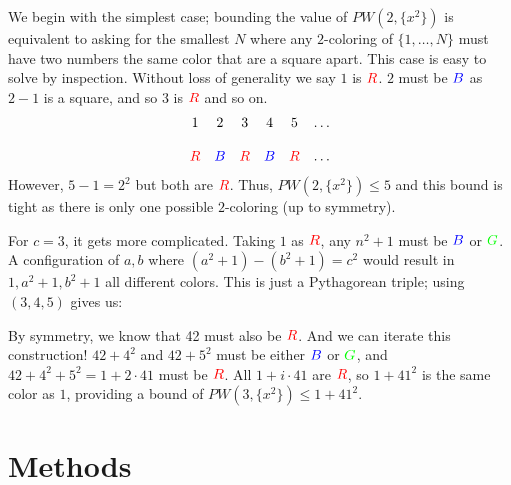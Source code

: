 \documentclass[a4paper]{amsproc}
\theoremstyle{plain}
\newcommand{\RR} {\color{red} R}
\newcommand{\BB} {\color{blue} B}
\newcommand{\GG} {\color{green} G}
\begin{document}
We begin with the simplest case; bounding the value of $PW(2,\{x^2\})$ is equivalent to asking for the smallest $N$ where any $2$-coloring of $\{1,\ldots,N\}$ must have two numbers the same color that are a square apart.
This case is easy to solve by inspection.
Without loss of generality we say $1$ is $\RR$.
$2$ must be $\BB$ as $2-1$ is a square, and so $3$ is $\RR$ and so on.
\[\begin{matrix}1&2&3&4&5&\ldots\\\\\RR&\BB&\RR&\BB&\RR&\ldots\end{matrix}\]
However, $5-1=2^2$ but both are $\RR$.
Thus, $PW(2,\{x^2\})\leq 5$ and this bound is tight as there is only one possible $2$-coloring (up to symmetry).

For $c=3$, it gets more complicated.
Taking $1$ as $\RR$, any $n^2+1$ must be $\BB$ or $\GG$.
A configuration of $a,b$ where $(a^2+1)-(b^2+1)=c^2$ would result in $1, a^2+1, b^2+1$ all different colors.
This is just a Pythagorean triple; using $(3,4,5)$ gives us:

\begin{figure}[H]
\caption{}
\label{fig:M0}
\end{figure}

By symmetry, we know that 42 must also be $\RR$.
And we can iterate this construction! $42+4^2$ and $42+5^2$ must be either $\BB$ or $\GG$, and $42+4^2+5^2=1+2\cdot41$ must be $\RR$.
All $1+i\cdot41$ are $\RR$, so $1+41^2$ is the same color as $1$, providing a bound of $PW(3, \{x^2\})\leq 1+41^2$.

\section{Methods}
\end{document}
